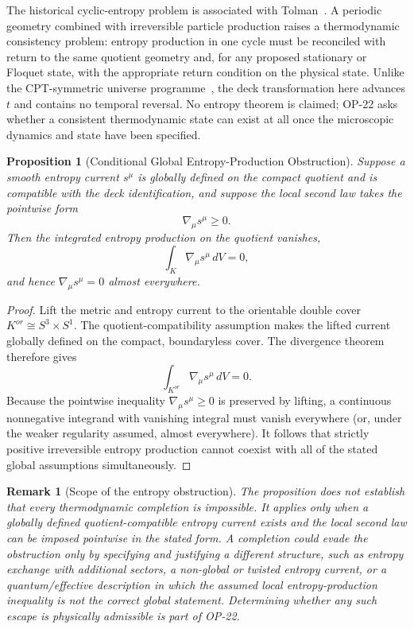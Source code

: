 \documentclass[11pt]{article}
\theoremstyle{canonmath}
\newtheorem{proposition}[theorem]{Proposition}
\newtheorem{remark}[theorem]{Remark}
\theoremstyle{canonpostulate}
\theoremstyle{canonclaim}
\providecommand{\Klein}{\mathcal{K}}
\def\mathrm#1{#1}%
\def\mathcal#1{#1}%
\begin{document}
The historical cyclic-entropy problem is associated with Tolman~\cite{Tolman1931,TolmanFine1948}. A periodic geometry combined with irreversible particle production raises a thermodynamic consistency problem: entropy production in one cycle must be reconciled with return to the same quotient geometry and, for any proposed stationary or Floquet state, with the appropriate return condition on the physical state. Unlike the CPT-symmetric universe programme~\cite{BoyleFinnTurok}, the deck transformation here advances $t$ and contains no temporal reversal. No entropy theorem is claimed; OP-22 asks whether a consistent thermodynamic state can exist at all once the microscopic dynamics and state have been specified.

\begin{proposition}[Conditional Global Entropy-Production Obstruction] \label{prop:entropy_obstruction}
Suppose a smooth entropy current $s^\mu$ is globally defined on the compact quotient and is compatible with the deck identification, and suppose the local second law takes the pointwise form
\begin{equation}
\nabla_\mu s^\mu\ge0.
\end{equation}
Then the integrated entropy production on the quotient vanishes,
\begin{equation}
\int_{\Klein}\nabla_\mu s^\mu\,dV=0,
\end{equation}
and hence $\nabla_\mu s^\mu=0$ almost everywhere.
\end{proposition}
\begin{proof}
Lift the metric and entropy current to the orientable double cover $\Klein^{\mathrm{or}}\cong S^3\times S^1$. The quotient-compatibility assumption makes the lifted current globally defined on the compact, boundaryless cover. The divergence theorem therefore gives
\begin{equation}
\int_{\Klein^{\mathrm{or}}}\nabla_\mu s^\mu\,dV=0.
\end{equation}
Because the pointwise inequality $\nabla_\mu s^\mu\ge0$ is preserved by lifting, a continuous nonnegative integrand with vanishing integral must vanish everywhere (or, under the weaker regularity assumed, almost everywhere). It follows that strictly positive irreversible entropy production cannot coexist with all of the stated global assumptions simultaneously.
\end{proof}

\begin{remark}[Scope of the entropy obstruction]
The proposition does not establish that every thermodynamic completion is impossible. It applies only when a globally defined quotient-compatible entropy current exists and the local second law can be imposed pointwise in the stated form. A completion could evade the obstruction only by specifying and justifying a different structure, such as entropy exchange with additional sectors, a non-global or twisted entropy current, or a quantum/effective description in which the assumed local entropy-production inequality is not the correct global statement. Determining whether any such escape is physically admissible is part of OP-22.
\end{remark}
\end{document}
